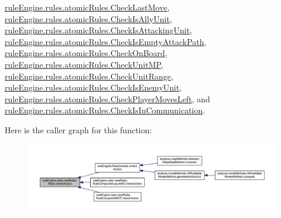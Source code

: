 \mbox{\hyperlink{classrule_engine_1_1rules_1_1atomic_rules_1_1_check_last_move_a1af50d2d1a89a15746df969f1925f66c}{rule\+Engine.\+rules.\+atomic\+Rules.\+Check\+Last\+Move}}, \mbox{\hyperlink{classrule_engine_1_1rules_1_1atomic_rules_1_1_check_is_ally_unit_a961880efbdfdf45e3ad9ecf31dc17cb8}{rule\+Engine.\+rules.\+atomic\+Rules.\+Check\+Is\+Ally\+Unit}}, \mbox{\hyperlink{classrule_engine_1_1rules_1_1atomic_rules_1_1_check_is_attacking_unit_a38eaf483b961fe287d49aede62f3aae5}{rule\+Engine.\+rules.\+atomic\+Rules.\+Check\+Is\+Attacking\+Unit}}, \mbox{\hyperlink{classrule_engine_1_1rules_1_1atomic_rules_1_1_check_is_empty_attack_path_a60ed32ecc147e0e79ce7800e2769e9da}{rule\+Engine.\+rules.\+atomic\+Rules.\+Check\+Is\+Empty\+Attack\+Path}}, \mbox{\hyperlink{classrule_engine_1_1rules_1_1atomic_rules_1_1_check_on_board_a73df87709e976673d0d42d0935a3a536}{rule\+Engine.\+rules.\+atomic\+Rules.\+Check\+On\+Board}}, \mbox{\hyperlink{classrule_engine_1_1rules_1_1atomic_rules_1_1_check_unit_m_p_ab5e04bb0355061dabd2ade65bf65d635}{rule\+Engine.\+rules.\+atomic\+Rules.\+Check\+Unit\+MP}}, \mbox{\hyperlink{classrule_engine_1_1rules_1_1atomic_rules_1_1_check_unit_range_a60608d1853c7963772dd07ba32733d11}{rule\+Engine.\+rules.\+atomic\+Rules.\+Check\+Unit\+Range}}, \mbox{\hyperlink{classrule_engine_1_1rules_1_1atomic_rules_1_1_check_is_enemy_unit_a0f5a8e1e1d38431310489f7c6bdb9776}{rule\+Engine.\+rules.\+atomic\+Rules.\+Check\+Is\+Enemy\+Unit}}, \mbox{\hyperlink{classrule_engine_1_1rules_1_1atomic_rules_1_1_check_player_moves_left_a3a8f57bf10ee10f87444523e98dda4d0}{rule\+Engine.\+rules.\+atomic\+Rules.\+Check\+Player\+Moves\+Left}}, and \mbox{\hyperlink{classrule_engine_1_1rules_1_1atomic_rules_1_1_check_is_in_communication_a333d209cb3eb29f7af7a09685c95afeb}{rule\+Engine.\+rules.\+atomic\+Rules.\+Check\+Is\+In\+Communication}}.

Here is the caller graph for this function\+:
\nopagebreak
\begin{figure}[H]
\begin{center}
\leavevmode
\includegraphics[width=350pt]{interfacerule_engine_1_1rules_1_1new_rules_1_1_i_rule_a72ce29a47d7a5fba75a09444a50a481e_icgraph}
\end{center}
\end{figure}
\mbox{\label{interfacerule_engine_1_1rules_1_1new_rules_1_1_i_rule_a99e11d165ca863908c6e985a79917067}} 
